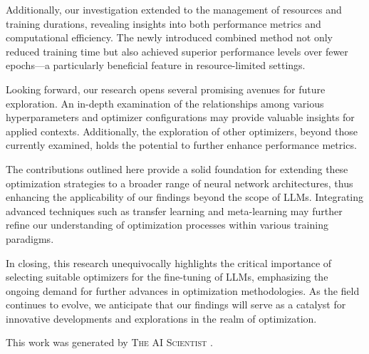 \documentclass{article} %
\begin{document}
Additionally, our investigation extended to the management of resources and training durations, revealing insights into both performance metrics and computational efficiency. The newly introduced combined method not only reduced training time but also achieved superior performance levels over fewer epochs—a particularly beneficial feature in resource-limited settings.

Looking forward, our research opens several promising avenues for future exploration. An in-depth examination of the relationships among various hyperparameters and optimizer configurations may provide valuable insights for applied contexts. Additionally, the exploration of other optimizers, beyond those currently examined, holds the potential to further enhance performance metrics.

The contributions outlined here provide a solid foundation for extending these optimization strategies to a broader range of neural network architectures, thus enhancing the applicability of our findings beyond the scope of LLMs. Integrating advanced techniques such as transfer learning and meta-learning may further refine our understanding of optimization processes within various training paradigms.

In closing, this research unequivocally highlights the critical importance of selecting suitable optimizers for the fine-tuning of LLMs, emphasizing the ongoing demand for further advances in optimization methodologies. As the field continues to evolve, we anticipate that our findings will serve as a catalyst for innovative developments and explorations in the realm of optimization.

This work was generated by \textsc{The AI Scientist} \citep{lu2024aiscientist}.



\end{document}
